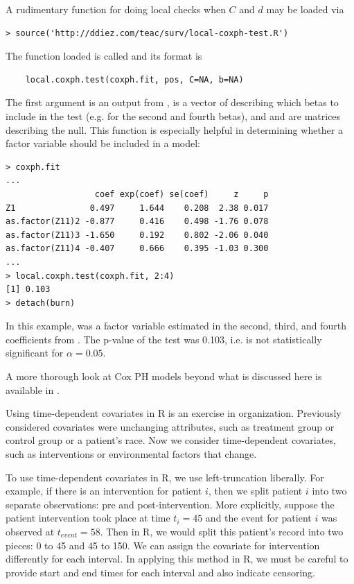 \documentclass[11pt]{article}
\begin{document}
A rudimentary function for doing local checks when $C$ and $d$ may be loaded via
\begin{verbatim}
> source('http://ddiez.com/teac/surv/local-coxph-test.R')
\end{verbatim}
The function loaded is called  and its format is
\begin{verbatim}
    local.coxph.test(coxph.fit, pos, C=NA, b=NA)
\end{verbatim}
The first argument is an output from ,  is a vector of describing which betas to include in the test (e.g.  for the second and fourth betas), and  and  are matrices describing the null. This function is especially helpful in determining whether a factor variable should be included in a model:
\begin{verbatim}
> coxph.fit
...
                  coef exp(coef) se(coef)     z     p
Z1               0.497     1.644    0.208  2.38 0.017
as.factor(Z11)2 -0.877     0.416    0.498 -1.76 0.078
as.factor(Z11)3 -1.650     0.192    0.802 -2.06 0.040
as.factor(Z11)4 -0.407     0.666    0.395 -1.03 0.300
...
> local.coxph.test(coxph.fit, 2:4)
[1] 0.103
> detach(burn)
\end{verbatim}
In this example,  was a factor variable estimated in the second, third, and fourth coefficients from . The p-value of the test was 0.103, i.e.  is not statistically significant for $\alpha=0.05$.

A more thorough look at Cox PH models beyond what is discussed here is available in .

\pagebreak

{}
\label{coxPHTimeDepCov}

Using time-dependent covariates in R is an exercise in organization. Previously considered covariates were unchanging attributes, such as treatment group or control group or a patient's race. Now we consider time-dependent covariates, such as interventions or environmental factors that change.

To use time-dependent covariates in R, we use left-truncation liberally. For example, if there is an intervention for patient $i$, then we split patient $i$ into two separate observations: pre and post-intervention. More explicitly, suppose the patient intervention took place at time $t_{i} = 45$ and the event for patient $i$ was observed at $t_{event}=58$. Then in R, we would split this patient's record into two pieces: 0 to 45 and 45 to 150. We can assign the covariate for intervention differently for each interval. In applying this method in R, we must be careful to provide start and end times for each interval and also indicate censoring.
\end{document}
